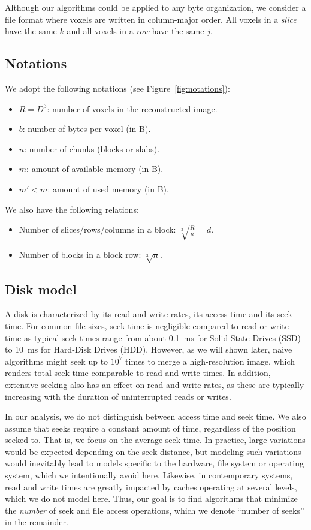 \documentclass[10pt, conference, compsocconf]{IEEEtran}
\begin{document}
Although our algorithms could be applied to any byte organization, we
consider a file format where voxels are written in column-major
order. All voxels in a \emph{slice} have the same $k$ and all voxels
in a \emph{row} have the same $j$.  

\subsection{Notations}

We adopt the following notations (see Figure~\ref{fig:notations}):
\begin{itemize}
\item $R=D^3$: number of voxels in the reconstructed image.
\item $b$: number of bytes per voxel (in B).
\item $n$: number of chunks (blocks or slabs).
\item $m$: amount of available memory (in B).
\item $m'<m$: amount of used memory (in B).
\end{itemize}
We also have the following relations:
\begin{itemize}
\item Number of slices/rows/columns in a block: $\sqrt[3]{\frac{R}{n}}=d$.
\item Number of blocks in a block row: $\sqrt[3]{n}$.
\end{itemize}

\subsection{Disk model}

A disk is characterized by its read and write rates, its access time
and its seek time. For common file sizes, seek time is negligible
compared to read or write time as typical seek times range from about
0.1~ms for Solid-State Drives (SSD) to 10~ms for Hard-Disk Drives
(HDD). However, as we will shown later, naive algorithms might seek up
to $10^7$ times to merge a high-resolution image, which renders total
seek time comparable to read and write times. In addition, extensive
seeking also has an effect on read and write rates, as these are
typically increasing with the duration of uninterrupted reads or
writes.

In our analysis, we do not distinguish between access time
and seek time.  We also assume that seeks require a constant amount of
time, regardless of the position seeked to. That is, we focus on the
average seek time. In practice, large variations would be expected
depending on the seek distance, but modeling such variations would
inevitably lead to models specific to the hardware, file system or
operating system, which we intentionally avoid here. Likewise, in
contemporary systems, read and write times are greatly impacted by caches
operating at several levels, which we do not model here. Thus, our
goal is to find algorithms that minimize the \emph{number} of seek and
file access operations, which we denote ``number of seeks'' in the
remainder.
\end{document}
